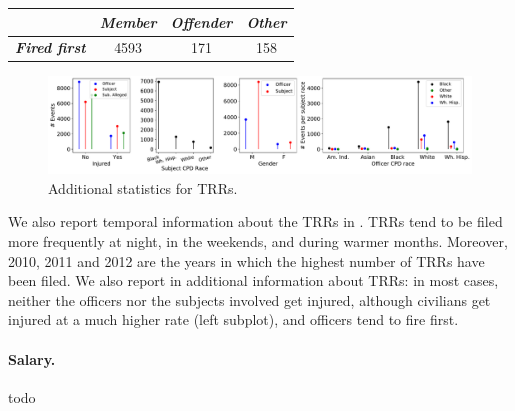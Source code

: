 \begin{table}[]
\begin{tabular}{c|c|c|c|}
\cline{2-4}
                                                    & \textit{Member} & \textit{Offender} & \textit{Other} \\ \hline
\multicolumn{1}{|c|}{\textit{\textbf{Fired first}}} & 4593            & 171               & 158            \\ \hline
\end{tabular}
\end{table}

\begin{figure}[t!] 
	\includegraphics[width=\textwidth]{figs/trr_stats} 
	\caption{Additional statistics for TRRs.} \label{fig:trrs_stats1}
\end{figure}

We also report temporal information about the TRRs in . TRRs tend to be filed more frequently at night, in the weekends, and during warmer months. Moreover, 2010, 2011 and 2012 are the years in which the highest number of TRRs have been filed. We also report in  additional information about TRRs: in most cases, neither the officers nor the subjects involved get injured, although civilians get injured at a much higher rate (left subplot), and officers tend to fire first. 
\paragraph{Salary.} todo

